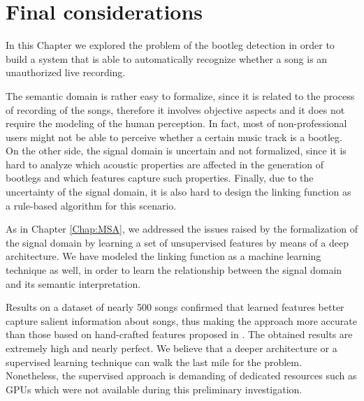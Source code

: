 \section{Final considerations}\label{sec:Bootleg:conclusion}
In this Chapter we explored the problem of the bootleg detection in order to build a system that is able to automatically recognize whether a song is an unauthorized live recording. 

The semantic domain is rather easy to formalize, since it is related to the process of recording of the songs, therefore it involves objective aspects and it does not require the modeling of the human perception. In fact, most of non-professional users might not be able to perceive whether a certain music track is a bootleg. On the other side, the signal domain is uncertain and not formalized, since it is hard to analyze which acoustic properties are affected in the generation of bootlegs and which features capture such properties. Finally, due to the uncertainty of the signal domain, it is also hard to design the linking function as a rule-based algorithm for this scenario.

As in Chapter \ref{Chap:MSA}, we addressed the issues raised by the formalization of the signal domain by learning a set of unsupervised features by means of a deep architecture. We have modeled the linking function as a machine learning technique as well, in order to learn the relationship between the signal domain and its semantic interpretation. 

Results on a dataset of nearly 500 songs confirmed that learned features better capture salient information about songs, thus making the approach more accurate than those based on hand-crafted features proposed in \cite{Bestagini2013b}. The obtained results are extremely high and nearly perfect. We believe that a deeper architecture or a supervised learning technique can walk the last mile for the problem. Nonetheless, the supervised approach is demanding of dedicated resources such as GPUs which were not available during this preliminary investigation.